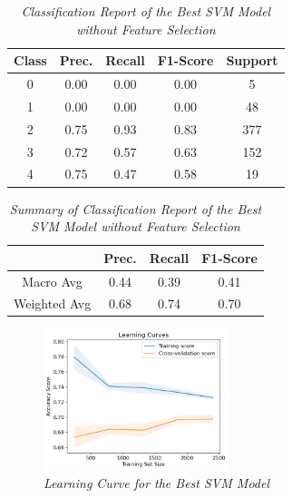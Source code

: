 \begin{table}[!ht]
    \begin{center}
        \begin{tabular}{c|c|c|c|c}			
            \hline
            Class & Prec. & Recall & F1-Score & Support \\
            \hline\hline
            0 & 0.00 & 0.00 & 0.00 & 5 \\
            1 & 0.00 & 0.00 & 0.00 & 48 \\
            2 & 0.75 & 0.93 & 0.83 & 377 \\
            3 & 0.72 & 0.57 & 0.63 & 152 \\
            4 & 0.75 & 0.47 & 0.58 & 19\\
            \hline
        \end{tabular}

        \caption{\textit{Classification Report of the Best SVM Model without Feature Selection}}
        \label{svm-report}

    \end{center}
\end{table}
\begin{table}[!ht]
    \begin{center}
        \begin{tabular}{c||c|c|c}			
            \hline
             & Prec. & Recall & F1-Score \\
             \hline\hline
            Macro Avg & 0.44 & 0.39 & 0.41 \\
            Weighted Avg & 0.68 & 0.74 & 0.70 \\
            \hline
        \end{tabular}

        \caption{\textit{Summary of Classification Report of the Best SVM Model without Feature Selection}}
        \label{svm-report-sum}

    \end{center}
\end{table}
\begin{figure}[!ht]
    \includegraphics[width = 0.48\textwidth]{res/svm-lc.png}
    \caption{\textit{Learning Curve for the Best SVM Model}}
    \label{fig:svm-lc}
\end{figure}
